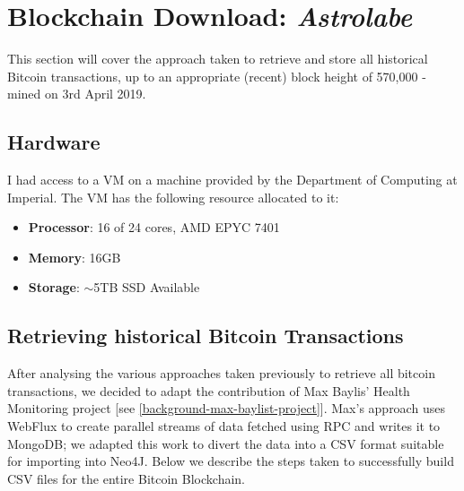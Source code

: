 \chapter{Blockchain Download: \textit{Astrolabe}}\label{section-blockchain-download}
This section will cover the approach taken to retrieve and store all historical Bitcoin transactions, up to an appropriate (recent) block height of 570,000 - mined on 3rd April 2019. 

\section{Hardware}\label{satoshi-specs}
I had access to a VM on a machine provided by the Department of Computing at Imperial.  The VM has the following resource allocated to it:
\begin{itemize}
    \item \textbf{Processor}: 16 of 24 cores, AMD EPYC 7401
    \item \textbf{Memory}: 16GB
    \item \textbf{Storage}: $\sim$5TB SSD Available
\end{itemize}

\section{Retrieving historical Bitcoin Transactions}
After analysing the various approaches taken previously to retrieve all bitcoin transactions, we decided to adapt the contribution of Max Baylis' Health Monitoring project [see \ref{background-max-baylist-project}]. Max's approach uses WebFlux to create parallel streams of data fetched using RPC and writes it to MongoDB; we adapted this work to divert the data into a CSV format suitable for importing into Neo4J. Below we describe the steps taken to successfully build CSV files for the entire Bitcoin Blockchain. 

